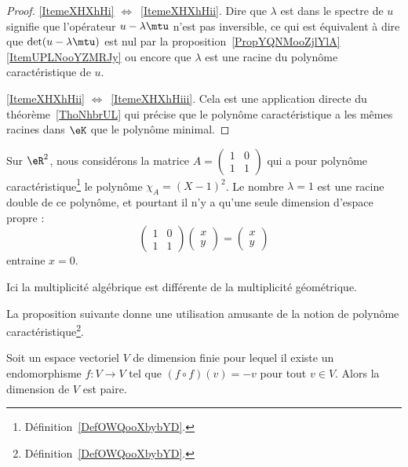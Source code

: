 \begin{proof}
    \ref{ItemeXHXhHi} \( \Leftrightarrow\)~\ref{ItemeXHXhHii}. Dire que \( \lambda\) est dans le spectre de \( u\) signifie que l'opérateur \( u-\lambda\mtu\) n'est pas inversible, ce qui est équivalent à dire que \( \det(u-\lambda\mtu)\) est nul par la proposition~\ref{PropYQNMooZjlYlA}\ref{ItemUPLNooYZMRJy} ou encore que \( \lambda\) est une racine du polynôme caractéristique de \( u\).

    \ref{ItemeXHXhHii} \( \Leftrightarrow\)~\ref{ItemeXHXhHiii}. Cela est une application directe du théorème~\ref{ThoNhbrUL} qui précise que le polynôme caractéristique a les mêmes racines dans \(\eK\) que le polynôme minimal.
\end{proof}

\begin{example} \label{ExICOJcFp}
    Sur \( \eR^2\), nous considérons la matrice \( A=\begin{pmatrix}
        1    &   0    \\
        1    &   1
    \end{pmatrix}\) qui a pour polynôme caractéristique\footnote{Définition~\ref{DefOWQooXbybYD}.} le polynôme \( \chi_A=(X-1)^2\). Le nombre \( \lambda=1\) est une racine double de ce polynôme, et pourtant il n'y a qu'une seule dimension d'espace propre :
    \begin{equation}
        \begin{pmatrix}
            1    &   0    \\
            1    &   1
        \end{pmatrix}\begin{pmatrix}
            x    \\
            y
        \end{pmatrix}=\begin{pmatrix}
            x    \\
            y
        \end{pmatrix}
    \end{equation}
    entraine \( x=0\).

    Ici la multiplicité algébrique est différente de la multiplicité géométrique.
\end{example}

La proposition suivante donne une utilisation amusante de la notion de polynôme caractéristique\footnote{Définition~\ref{DefOWQooXbybYD}.}.
\begin{proposition}
    Soit un espace vectoriel \( V\) de dimension finie pour lequel il existe un endomorphisme \( f\colon V\to V\) tel que \( (f\circ f)(v)=-v\) pour tout \( v\in V\). Alors la dimension de \( V\) est paire.
\end{proposition}

